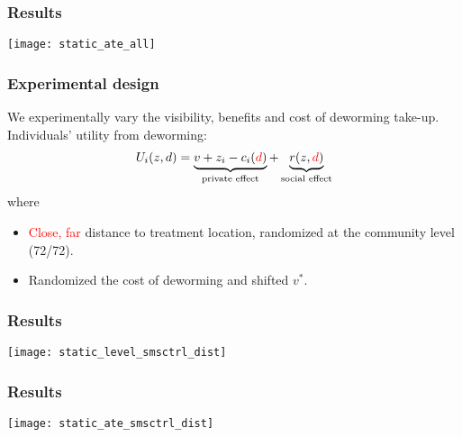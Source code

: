 \documentclass{beamer}
\theoremstyle{plain}
\begin{document}
\begin{frame}[label=slide21]
\frametitle{\large{Results}}
\begin{center}
\texttt{[image: static\_ate\_all]}
\end{center}
\hyperlink{slide102}{}
\end{frame}

\begin{frame}[label=slide22]
\frametitle{\large{Experimental design}}
We experimentally vary the visibility, benefits and cost of deworming take-up. Individuals' utility from deworming:
\bigskip
\begin{align}
U_{i}(z,d) = \underbrace{v + z_i - c_i(\textcolor{red}{d})}_{\text{private effect}} + \underbrace{r(z,\textcolor{red}{d})}_{\text{social effect}}  \nonumber   
\end{align}
where 
\begin{itemize}
\item \textcolor{red}{Close, far} distance to treatment location, randomized at the community level (72/72).  \hyperlink{slide103}{}
\item Randomized the cost of deworming and shifted $v^{*}$. %
\end{itemize}
\end{frame}

\begin{frame}[label=slide24]
\frametitle{\large{Results}}
\begin{center}
\texttt{[image: static\_level\_smsctrl\_dist]}
\end{center}
\end{frame}

\begin{frame}[label=slide25]
\frametitle{\large{Results}}
\begin{center}
\texttt{[image: static\_ate\_smsctrl\_dist]}
\end{center}
\end{frame}
\end{document}
